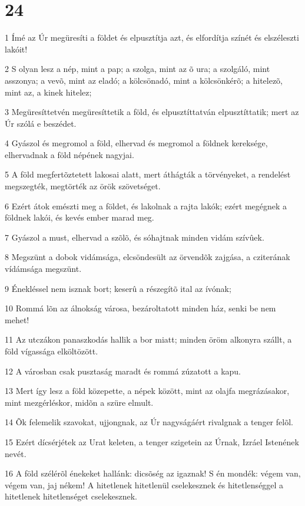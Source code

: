 \chapter{24}

\par 1 Ímé az Úr megüresíti a földet és elpusztítja azt, és elfordítja színét és elszéleszti lakóit!
\par 2 S olyan lesz a nép, mint a pap; a szolga, mint az õ ura; a szolgáló, mint asszonya; a vevõ, mint az eladó; a kölcsönadó, mint a kölcsönkérõ; a hitelezõ, mint az, a kinek hitelez;
\par 3 Megüresíttetvén megüresíttetik a föld, és elpusztíttatván elpusztíttatik; mert az Úr szólá e beszédet.
\par 4 Gyászol és megromol a föld, elhervad és megromol a földnek kereksége, elhervadnak a föld népének nagyjai.
\par 5 A föld megfertõztetett lakosai alatt, mert áthágták a törvényeket, a rendelést megszegték, megtörték az örök szövetséget.
\par 6 Ezért átok emészti meg a földet, és lakolnak a rajta lakók; ezért megégnek a földnek lakói, és kevés ember marad meg.
\par 7 Gyászol a must, elhervad a szõlõ, és sóhajtnak minden vidám szívûek.
\par 8 Megszünt a dobok vidámsága, elcsöndesült az örvendõk zajgása, a cziterának vídámsága megszünt.
\par 9 Énekléssel nem isznak bort; keserû a részegítõ ital az ívónak;
\par 10 Rommá lõn az álnokság városa, bezároltatott minden ház, senki be nem mehet!
\par 11 Az utczákon panaszkodás hallik a bor miatt; minden öröm alkonyra szállt, a föld vígassága elköltözött.
\par 12 A városban csak pusztaság maradt és rommá zúzatott a kapu.
\par 13 Mert így lesz a föld közepette, a népek között, mint az olajfa megrázásakor, mint mezgérléskor, midõn a szüre elmult.
\par 14 Õk felemelik szavokat, ujjongnak, az Úr nagyságáért rivalgnak a tenger felõl.
\par 15 Ezért dícsérjétek az Urat keleten, a tenger szigetein az Úrnak, Izráel Istenének nevét.
\par 16 A föld szélérõl énekeket hallánk: dicsõség az igaznak! S én mondék: végem van, végem van, jaj nékem! A hitetlenek hitetlenül cselekesznek és hitetlenséggel a hitetlenek hitetlenséget cselekesznek.

